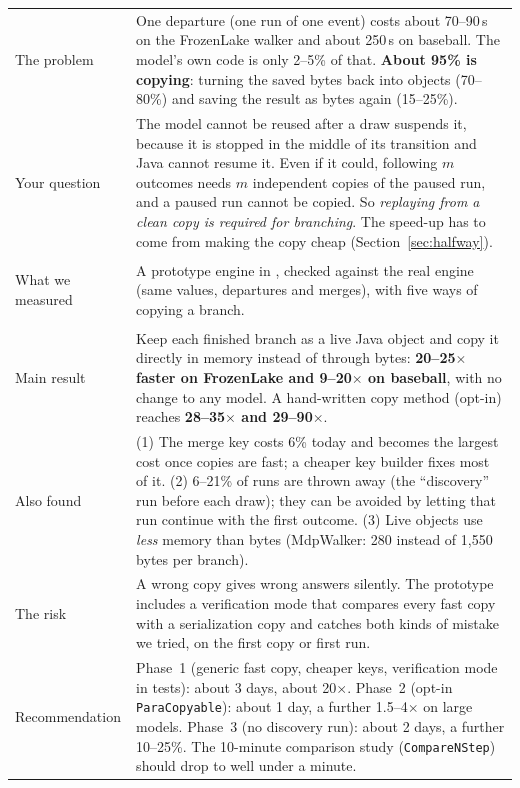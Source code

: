 \documentclass[11pt]{article}
\newcommand{\code}[1]{\texttt{#1}}
\newcommand{\us}{\,\textmu s}
\begin{document}
\begin{tabularx}{\linewidth}{@{}>{\bfseries\raggedright\arraybackslash}p{3.5cm}Y@{}}
\toprule
The problem & One departure (one run of one event) costs about 70--90\us{} on the FrozenLake walker and about
  250\us{} on baseball. The model's own code is only 2--5\% of that. \textbf{About 95\% is copying}: turning the saved
  bytes back into objects (70--80\%) and saving the result as bytes again (15--25\%).\\
Your question & The model cannot be reused after a draw suspends it, because it is stopped in the middle of its
  transition and Java cannot resume it. Even if it could, following $m$ outcomes needs $m$ independent copies of the
  paused run, and a paused run cannot be copied. So \emph{replaying from a clean copy is required for branching}.
  The speed-up has to come from making the copy cheap (Section~\ref{sec:halfway}).\\
What we measured & A prototype engine in , checked against the real engine (same values,
  departures and merges), with five ways of copying a branch.\\
Main result & Keep each finished branch as a live Java object and copy it directly in memory instead of through
  bytes: \textbf{20--25$\times$ faster on FrozenLake and 9--20$\times$ on baseball}, with no change to any model.
  A hand-written copy method (opt-in) reaches \textbf{28--35$\times$ and 29--90$\times$}.\\
Also found & (1) The merge key costs 6\% today and becomes the largest cost once copies are fast; a cheaper key
  builder fixes most of it. (2) 6--21\% of runs are thrown away (the ``discovery'' run before each draw); they can be
  avoided by letting that run continue with the first outcome. (3) Live objects use \emph{less} memory than bytes
  (MdpWalker: 280 instead of 1{,}550 bytes per branch).\\
The risk & A wrong copy gives wrong answers silently. The prototype includes a verification mode that compares every
  fast copy with a serialization copy and catches both kinds of mistake we tried, on the first copy or first run.\\
Recommendation & Phase~1 (generic fast copy, cheaper keys, verification mode in tests): about 3 days, about
  20$\times$. Phase~2 (opt-in \code{ParaCopyable}): about 1 day, a further 1.5--4$\times$ on large models.
  Phase~3 (no discovery run): about 2 days, a further 10--25\%. The 10-minute comparison study
  (\code{CompareNStep}) should drop to well under a minute.\\
\bottomrule
\end{tabularx}
\end{document}

